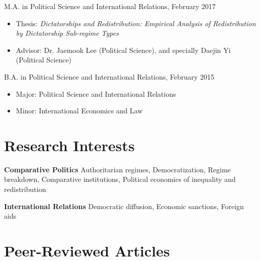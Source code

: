\documentclass[margin,line]{res}
\begin{document}
\begin{resume}
\vspace*{-4mm}
M.A. in Political Science and International Relations, February 2017\\
\vspace*{-4mm}
\begin{itemize} \itemsep -1mm 
	\item[]  \hspace*{-6mm} Thesis: {\it Dictatorships and Redistribution: Empirical Analysis of Redistribution by Dictatorship Sub-regime Types}
	\item[]  \hspace*{-6mm} Advisor: Dr. Jaemook Lee (Political Science), and specially Daejin Yi (Political Science)
\end{itemize}
\vspace*{-3mm}
B.A. in Political Science and International Relations, February 2015\\
\vspace*{-4mm}
\begin{itemize} \itemsep -1mm
	\item[]  \hspace*{-6mm} Major: Political Science and International Relations
	\item[]  \hspace*{-6mm} Minor: International Economics and Law
\end{itemize}

\section{\sc Research Interests}
{\bf Comparative Politics} Authoritarian regimes, Democratization, Regime breakdown, Comparative institutions, Political economics of inequality and redistribution

\vspace{-.3cm}
{\bf International Relations} Democratic diffusion, Economic sanctions, Foreign aids

\section{\sc Peer-Reviewed Articles}


\end{resume}
\end{document}
